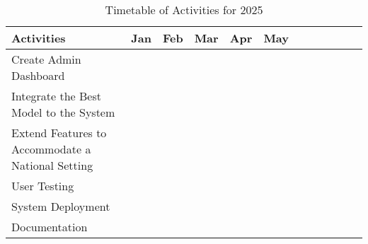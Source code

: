 \begin{table}[ht]
	\centering
	\caption{Timetable of Activities for 2025} \vspace{0.25em}
	\begin{tabular}{|p{2in}|c|c|c|c|c|c|c|c|c|c|c|} \hline
		Activities & Jan & Feb & Mar & Apr & May \\ \hline
		Create Admin Dashboard & \weekone & \weekthree & & & \\ \hline
		Integrate the Best Model to the System & \weekone & \weekfour & & & \\ \hline
		Extend Features to Accommodate a National Setting & & \weekone & \weektwo & & \\ \hline
		User Testing & & & \weektwo & \weekone & \\ \hline
		System Deployment & & & & \weekthree & \\ \hline
		Documentation & \weektwo & \weekfour & \weekfour & \weekfour & \weekfour  \\ \hline		
	\end{tabular}
	\label{tab:timetableactivities2025}
\end{table}



